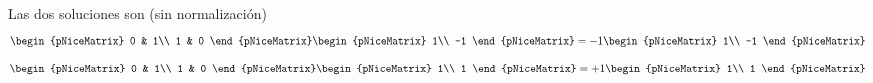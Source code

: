 Las dos soluciones son (sin normalización)
\[
  \begin{pNiceMatrix}
    0 & 1\\
    1 & 0
  \end{pNiceMatrix}
  \begin{pNiceMatrix}
    1\\
    -1
  \end{pNiceMatrix}
  = -1
  \begin{pNiceMatrix}
    1\\
    -1
  \end{pNiceMatrix}
\]
\[
  \begin{pNiceMatrix}
    0 & 1\\
    1 & 0
  \end{pNiceMatrix}
  \begin{pNiceMatrix}
    1\\
    1
  \end{pNiceMatrix}
  = +1
  \begin{pNiceMatrix}
    1\\
    1
  \end{pNiceMatrix}
\]











